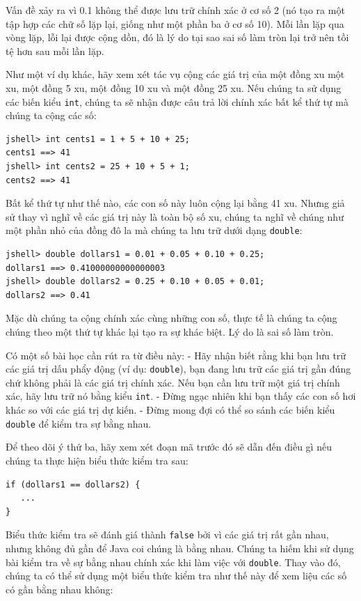 Vấn đề xảy ra vì 0.1 không thể được lưu trữ chính xác ở cơ số 2 (nó tạo
ra một tập hợp các chữ số lặp lại, giống như một phần ba ở cơ số 10).
Mỗi lần lặp qua vòng lặp, lỗi lại được cộng dồn, đó là lý do tại sao sai
số làm tròn lại trở nên tồi tệ hơn sau mỗi lần lặp.

Như một ví dụ khác, hãy xem xét tác vụ cộng các giá trị của một đồng xu
một xu, một đồng 5 xu, một đồng 10 xu và một đồng 25 xu. Nếu chúng ta sử
dụng các biến kiểu \texttt{int}, chúng ta sẽ nhận được câu trả lời chính
xác bất kể thứ tự mà chúng ta cộng các số:

\begin{verbatim}
jshell> int cents1 = 1 + 5 + 10 + 25; 
cents1 ==> 41
jshell> int cents2 = 25 + 10 + 5 + 1; 
cents2 ==> 41
\end{verbatim}

Bất kể thứ tự như thế nào, các con số này luôn cộng lại bằng 41 xu.
Nhưng giả sử thay vì nghĩ về các giá trị này là toàn bộ số xu, chúng ta
nghĩ về chúng như một phần nhỏ của đồng đô la mà chúng ta lưu trữ dưới
dạng \texttt{double}:

\begin{verbatim}
jshell> double dollars1 = 0.01 + 0.05 + 0.10 + 0.25; 
dollars1 ==> 0.41000000000000003
jshell> double dollars2 = 0.25 + 0.10 + 0.05 + 0.01; 
dollars2 ==> 0.41
\end{verbatim}

Mặc dù chúng ta cộng chính xác cùng những con số, thực tế là chúng ta
cộng chúng theo một thứ tự khác lại tạo ra sự khác biệt. Lý do là sai số
làm tròn.

Có một số bài học cần rút ra từ điều này: - Hãy nhận biết rằng khi bạn
lưu trữ các giá trị dấu phẩy động (ví dụ: \texttt{double}), bạn đang lưu
trữ các giá trị gần đúng chứ không phải là các giá trị chính xác. Nếu
bạn cần lưu trữ một giá trị chính xác, hãy lưu trữ nó bằng kiểu
\texttt{int}. - Đừng ngạc nhiên khi bạn thấy các con số hơi khác so với
các giá trị dự kiến. - Đừng mong đợi có thể so sánh các biến kiểu
\texttt{double} để kiểm tra sự bằng nhau.

Để theo dõi ý thứ ba, hãy xem xét đoạn mã trước đó sẽ dẫn đến điều gì
nếu chúng ta thực hiện biểu thức kiểm tra sau:

\begin{verbatim}
if (dollars1 == dollars2) {
   ...
}
\end{verbatim}

Biểu thức kiểm tra sẽ đánh giá thành \texttt{false} bởi vì các giá trị
rất gần nhau, nhưng không đủ gần để Java coi chúng là bằng nhau. Chúng
ta hiếm khi sử dụng bài kiểm tra về sự bằng nhau chính xác khi làm việc
với \texttt{double}. Thay vào đó, chúng ta có thể sử dụng một biểu thức
kiểm tra như thế này để xem liệu các số có gần bằng nhau không:

